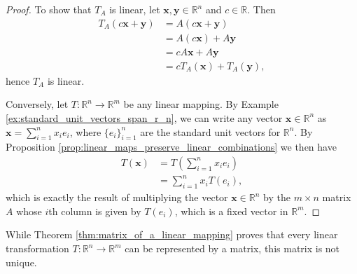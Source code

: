 \documentclass[12pt,letterpaper,reqno]{article}
\numberwithin{equation}{section}
\begin{document}
\begin{proof}
	To show that $T_A$ is linear, let $\mathbf{x},\mathbf{y} \in \mathbb{R}^n$ and $c \in \mathbb{R}$. Then
	\begin{align*}
		T_A(c\mathbf{x}+\mathbf{y})&=A(c\mathbf{x}+\mathbf{y}) \\
		&=A(c\mathbf{x})+A\mathbf{y} \\
		&=cA\mathbf{x}+A\mathbf{y} \\
		&=cT_A(\mathbf{x})+T_A(\mathbf{y}),
	\end{align*}
	hence $T_A$ is linear.
	
	Conversely, let $T:\mathbb{R}^n \to \mathbb{R}^m$ be any linear mapping. By Example \ref{ex:standard_unit_vectors_span_r_n}, we can write any vector $\mathbf{x} \in \mathbb{R}^n$ as $\mathbf{x}=\sum_{i=1}^nx_ie_i$, where $\{e_i\}_{i=1}^n$ are the standard unit vectors for $\mathbb{R}^n$. By Proposition \ref{prop:linear_maps_preserve_linear_combinations} we then have
	\begin{align*}
		T(\mathbf{x})&=T\left(\sum_{i=1}^nx_ie_i\right) \\
		&=\sum_{i=1}^nx_iT(e_i),
	\end{align*}
	which is exactly the result of multiplying the vector $\mathbf{x} \in \mathbb{R}^n$ by the $m \times n$ matrix $A$ whose $i$th column is given by $T(e_i)$, which is a fixed vector in $\mathbb{R}^m$. 
\end{proof}
While Theorem \ref{thm:matrix_of_a_linear_mapping} proves that every linear transformation $T:\mathbb{R}^n \to \mathbb{R}^m$ can be represented by a matrix, this matrix is not unique. 
\end{document}
